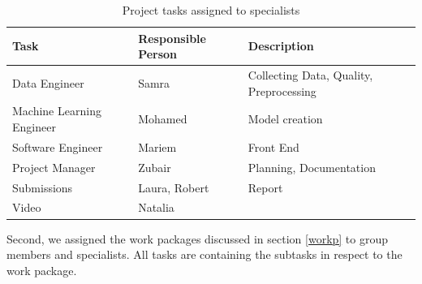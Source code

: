 \documentclass[lang=english,inputenc=utf8,fontsize=10pt]{ldvarticle}
\begin{document}
\begin{table}[ht]
\begin{tabular}{l|l|l}
Task                      & Responsible Person  & Description                             \\ \hline
Data Engineer             & Samra               & Collecting Data, Quality, Preprocessing \\
Machine Learning Engineer & Mohamed             & Model creation                          \\
Software Engineer         & Mariem              & Front End                               \\
Project Manager           & Zubair              & Planning, Documentation                 \\
Submissions               & Laura, Robert       & Report                                  \\
Video                     & Natalia             &                                        
\end{tabular}
\caption{Project tasks assigned to specialists}
\label{tab:special}
\end{table}

Second, we assigned the work packages discussed in section \ref{workp} to group members and specialists. All tasks are containing the subtasks in respect to the work package.
\end{document}
